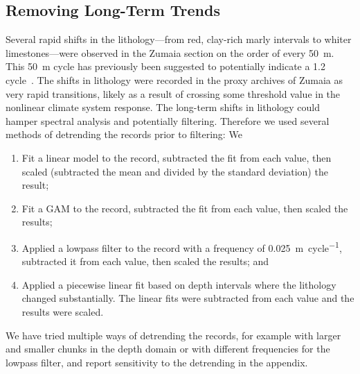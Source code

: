 \documentclass[draft]{agujournal2019}
\newcommand{\rez}{\textcolor{magenta}}
\newcommand{\ijk}{\textcolor{blue}}
\begin{document}
\subsection{Removing Long-Term Trends}\label{sec:detrend}

Several rapid shifts in the lithology---from red, clay-rich marly intervals to whiter limestones---were observed in the Zumaia section on the order of every \qty{50}{\metre}.
This \qty{50}{\metre} cycle has previously been suggested to potentially indicate a \qty{1.2}{\millionyear} cycle~\cite{Batenburg2014}.
The shifts in lithology were recorded in the proxy archives of Zumaia as very rapid transitions, likely as a result of crossing some threshold value in the nonlinear climate system response.
The long-term shifts in lithology could hamper spectral analysis and potentially filtering.
Therefore we used several methods of detrending the records prior to filtering: We
\begin{enumerate}
    \item Fit a linear model to the record, subtracted the fit from each value, then scaled (subtracted the mean and divided by the standard deviation) the result;
    \item Fit a \gls{GAM} to the record, subtracted the fit from each value, then scaled the results;
    \item Applied a lowpass filter to the record with a frequency of \qty{0.025}{\metre\per cycle}, subtracted it from each value, then scaled the results;
and
    \item Applied a piecewise linear fit based on depth intervals where the lithology changed substantially.
    The linear fits were subtracted from each value and the results were scaled.
\end{enumerate}

We have tried multiple ways of detrending the records, for example with larger and smaller chunks in the depth domain or with different frequencies for the lowpass filter, and report sensitivity to the detrending in the appendix.

\end{document}

